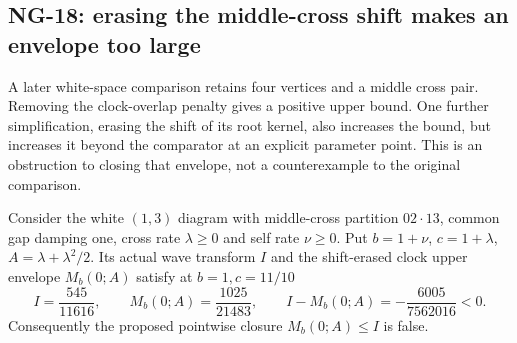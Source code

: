 \subsection[NG-18: an oversized middle-cross envelope]{NG-18: erasing the middle-cross shift makes an envelope too large}
\label{S:nogo-18}

A later white-space comparison retains four vertices and a middle cross
pair. Removing the clock-overlap penalty gives a positive upper bound.
One further simplification, erasing the shift of its root kernel, also
increases the bound, but increases it beyond the comparator at an explicit
parameter point. This is an obstruction to closing that envelope, not a
counterexample to the original comparison.

\setcounter{nogo}{17}
\begin{nogo}
  \label{P:nogo-18}
  Consider the white $(1,3)$ diagram with middle-cross partition $02\cdot13$,
  common gap damping one, cross rate $\lambda\ge0$ and self rate $\nu\ge0$.
  Put $b=1+\nu$, $c=1+\lambda$, $A=\lambda+\lambda^2/2$. Its actual wave
  transform $I$ and the shift-erased clock upper envelope $M_b(0;A)$ satisfy
  at $b=1,c=11/10$
  \[
    I=\frac{545}{11616},\qquad M_b(0;A)=\frac{1025}{21483},\qquad
    I-M_b(0;A)=-\frac{6005}{7562016}<0.
  \]
  Consequently the proposed pointwise closure $M_b(0;A)\le I$ is false.
\end{nogo}
